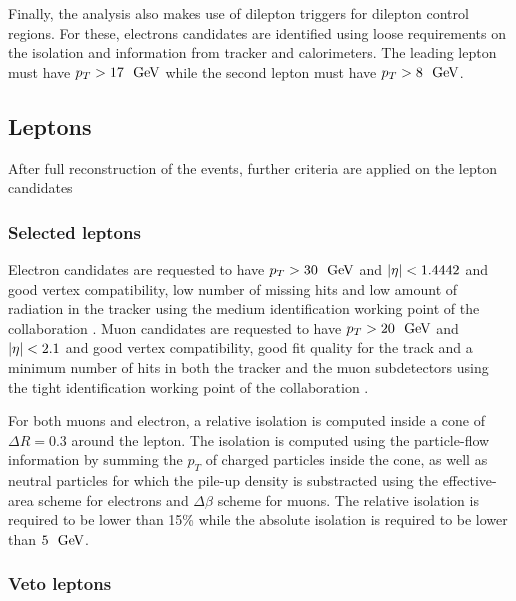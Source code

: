     Finally, the analysis also makes use of dilepton triggers for dilepton control regions. For these, electrons
    candidates are identified using loose requirements on the isolation and information from tracker and calorimeters.
    The leading lepton must have $p_T > 17~~\text{GeV}$ while the second lepton must have $p_T > 8~~\text{GeV}$.

        \subsection{Leptons}

        After full reconstruction of the events, further criteria are applied on the lepton candidates 

            \subsubsection{Selected leptons}

        Electron candidates are requested to have $p_T > 30~~\text{GeV}$ and $\left| \eta \right| < 1.4442$ and good vertex compatibility,
        low number of missing hits and low amount of radiation in the tracker using the medium identification working point
        of the collaboration . Muon candidates are requested to have $p_T > 20~~\text{GeV}$ and $\left| \eta \right| < 2.1$
        and good vertex compatibility, good fit quality for the track and a minimum number of hits in both the tracker
        and the muon subdetectors using the tight identification working point of the collaboration .

        For both muons and electron, a relative isolation is computed inside a cone of $\Delta R = 0.3$ around the lepton.
        The isolation is computed using the particle-flow information by summing the $p_T$ of charged particles inside
        the cone, as well as neutral particles for which the pile-up density is substracted using the effective-area 
        scheme for electrons and $\Delta \beta$ scheme for muons. The relative isolation is required to be lower than
        15\% while the absolute isolation is required to be lower than $5~~\text{GeV}$.

        \subsubsection{Veto leptons \label{sec:vetoLeptons}}

